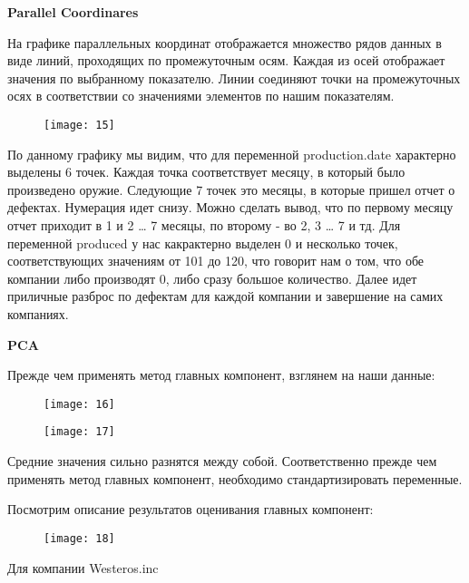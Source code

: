 \documentclass{beamer}
\begin{document}
\begin{frame}
\textbf{Parallel Coordinares}


На графике параллельных координат отображается множество рядов данных в виде линий, проходящих по промежуточным осям. Каждая из осей отображает значения по выбранному показателю. Линии соединяют точки на промежуточных осях в соответствии со значениями элементов по нашим показателям.

\end{frame}

\begin{frame}
\begin{figure}[t]
	\centering
	\texttt{[image: 15]}
\end{figure}
\end{frame}

\begin{frame}
По данному графику мы видим, что для переменной production.date характерно выделены 6 точек. Каждая точка соответствует месяцу, в который было произведено оружие. Следующие 7 точек это месяцы, в которые пришел отчет о дефектах. Нумерация идет снизу. Можно сделать вывод, что по первому месяцу отчет приходит в 1 и 2 … 7 месяцы, по второму - во 2, 3 … 7 и тд.  Для переменной produced у нас какрактерно выделен 0 и несколько точек, соответствующих значениям от 101 до 120, что говорит нам о том, что обе компании либо производят 0, либо сразу большое количество. Далее идет приличные разброс по дефектам для каждой компании и завершение на самих компаниях. 
\end{frame}

\begin{frame}
\textbf{PCA}


Прежде чем применять метод главных компонент, взглянем на наши данные:
\begin{figure}[t]
	\centering
	\texttt{[image: 16]}
\end{figure}
\begin{figure}[t]
	\centering
	\texttt{[image: 17]}
\end{figure}
\end{frame}

\begin{frame}
Средние значения сильно разнятся между собой. Соответственно прежде чем применять метод главных компонент, необходимо стандартизировать переменные. 

Посмотрим описание результатов оценивания главных компонент:
\begin{figure}[h]
	\centering
	\texttt{[image: 18]}
\end{figure}
Для компании Westeros.inc
\end{frame}
\end{document}
